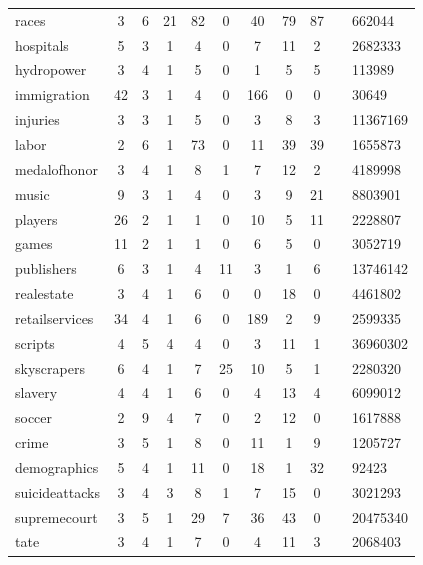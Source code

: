 \begin{figure*}
\begin{tabular}{ l | c c | c c c c c c |}
races & 3 & 6 & 21 & 82 & 0 & 40 & 79 & 87 &  & 662044\\
hospitals & 5 & 3 & 1 & 4 & 0 & 7 & 11 & 2 &  & 2682333\\
hydropower & 3 & 4 & 1 & 5 & 0 & 1 & 5 & 5 &  & 113989\\
immigration & 42 & 3 & 1 & 4 & 0 & 166 & 0 & 0 &  & 30649\\
injuries & 3 & 3 & 1 & 5 & 0 & 3 & 8 & 3 &  & 11367169\\
labor & 2 & 6 & 1 & 73 & 0 & 11 & 39 & 39 &  & 1655873\\
medalofhonor & 3 & 4 & 1 & 8 & 1 & 7 & 12 & 2 &  & 4189998\\
music & 9 & 3 & 1 & 4 & 0 & 3 & 9 & 21 &  & 8803901\\
players & 26 & 2 & 1 & 1 & 0 & 10 & 5 & 11 &  & 2228807\\
games & 11 & 2 & 1 & 1 & 0 & 6 & 5 & 0 &  & 3052719\\
publishers & 6 & 3 & 1 & 4 & 11 & 3 & 1 & 6 &  & 13746142\\
realestate & 3 & 4 & 1 & 6 & 0 & 0 & 18 & 0 &  & 4461802\\
retailservices & 34 & 4 & 1 & 6 & 0 & 189 & 2 & 9 &  & 2599335\\
scripts & 4 & 5 & 4 & 4 & 0 & 3 & 11 & 1 &  & 36960302\\
skyscrapers & 6 & 4 & 1 & 7 & 25 & 10 & 5 & 1 &  & 2280320\\
slavery & 4 & 4 & 1 & 6 & 0 & 4 & 13 & 4 &  & 6099012\\
soccer & 2 & 9 & 4 & 7 & 0 & 2 & 12 & 0 &  & 1617888\\
crime & 3 & 5 & 1 & 8 & 0 & 11 & 1 & 9 &  & 1205727\\
demographics & 5 & 4 & 1 & 11 & 0 & 18 & 1 & 32 &  & 92423\\
suicideattacks & 3 & 4 & 3 & 8 & 1 & 7 & 15 & 0 &  & 3021293\\
supremecourt & 3 & 5 & 1 & 29 & 7 & 36 & 43 & 0 &  & 20475340\\
tate & 3 & 4 & 1 & 7 & 0 & 4 & 11 & 3 &  & 2068403\\
\end{tabular}
\end{figure*}

